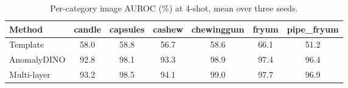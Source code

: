 \begin{table}[t]
\centering
\small
\caption{Per-category image AUROC (\%) at 4-shot, mean over three seeds.}
\label{tab:category}
\begin{tabular}{lcccccc}
\toprule
Method & candle & capsules & cashew & chewinggum & fryum & pipe\_fryum \\
\midrule
Template & 58.0 & 58.8 & 56.7 & 58.6 & 66.1 & 51.2 \\
AnomalyDINO & 92.8 & 98.1 & 93.3 & 98.9 & 97.4 & 96.4 \\
Multi-layer & 93.2 & 98.5 & 94.1 & 99.0 & 97.7 & 96.9 \\
\bottomrule
\end{tabular}
\end{table}

